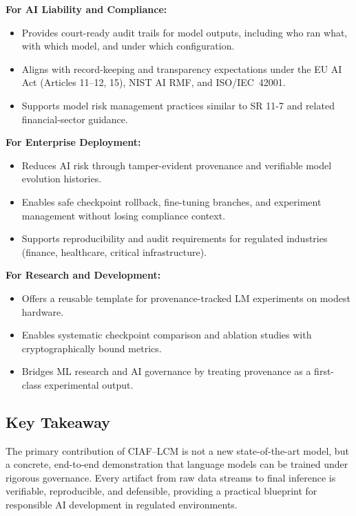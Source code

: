 \documentclass[11pt,a4paper]{article}
\begin{document}
\textbf{For AI Liability and Compliance:}
\begin{itemize}
    \item Provides court-ready audit trails for model outputs, including who ran
    what, with which model, and under which configuration.
    \item Aligns with record-keeping and transparency expectations under the EU AI
    Act (Articles 11--12, 15), NIST AI RMF, and ISO/IEC~42001.
    \item Supports model risk management practices similar to SR 11-7 and related
    financial-sector guidance.
\end{itemize}

\textbf{For Enterprise Deployment:}
\begin{itemize}
    \item Reduces AI risk through tamper-evident provenance and verifiable model
    evolution histories.
    \item Enables safe checkpoint rollback, fine-tuning branches, and experiment
    management without losing compliance context.
    \item Supports reproducibility and audit requirements for regulated industries
    (finance, healthcare, critical infrastructure).
\end{itemize}

\textbf{For Research and Development:}
\begin{itemize}
    \item Offers a reusable template for provenance-tracked LM experiments on
    modest hardware.
    \item Enables systematic checkpoint comparison and ablation studies with
    cryptographically bound metrics.
    \item Bridges ML research and AI governance by treating provenance as a
    first-class experimental output.
\end{itemize}

\subsection*{Key Takeaway}

The primary contribution of CIAF--LCM is not a new state-of-the-art model, but a
concrete, end-to-end demonstration that language models can be trained under rigorous
governance. Every artifact from raw data streams to final inference is
verifiable, reproducible, and defensible, providing a practical blueprint for
responsible AI development in regulated environments.
\end{document}
